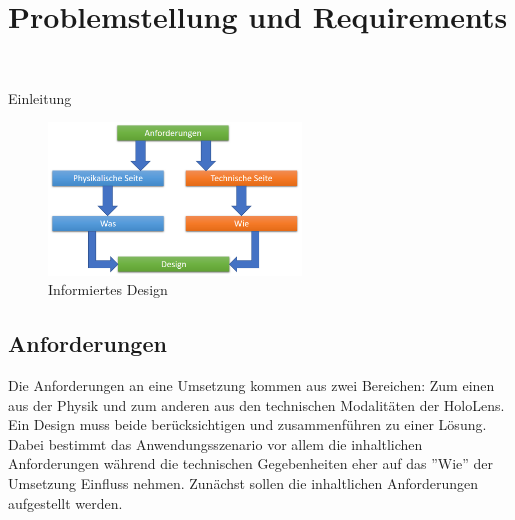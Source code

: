 \section{Problemstellung und Requirements}
\label{sec-3}
\begin{center}
	\\
\end{center}


Einleitung

\begin{figure}[h!]
	\centering
	\includegraphics[width=0.6\textwidth]{images/Informiertes_Design.png}
	\caption{Informiertes Design}
	\label{img:Informiertes_Design}
\end{figure}

\subsection{Anforderungen}
\label{sec-3-1}
Die Anforderungen an eine Umsetzung kommen aus zwei Bereichen: Zum einen aus der Physik und zum anderen aus den technischen Modalitäten der HoloLens. Ein Design muss beide berücksichtigen und zusammenführen zu einer Lösung. Dabei bestimmt das Anwendungsszenario vor allem die inhaltlichen Anforderungen während die technischen Gegebenheiten eher auf das ''Wie'' der Umsetzung Einfluss nehmen. Zunächst sollen die inhaltlichen Anforderungen aufgestellt werden.

